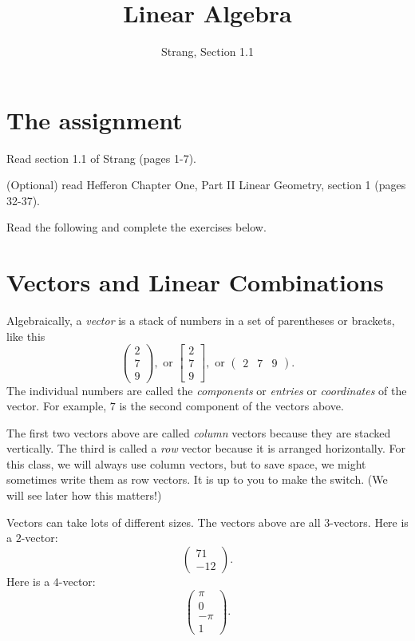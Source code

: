 \documentclass[11pt]{amsart}
\theoremstyle{definition}
\begin{document}
\title{Linear Algebra}
\author{Strang, Section 1.1}
\maketitle

\section{The assignment}
\begin{compactitem}
\item Read section 1.1 of Strang (pages 1-7).
\item (Optional) read Hefferon Chapter One, Part II Linear Geometry, section 1 (pages 32-37).
\item Read the following and complete the exercises below.
\end{compactitem}


\section{Vectors and Linear Combinations}

Algebraically, a \emph{vector} is a stack of numbers in a set of parentheses or brackets, like this
\[
\begin{pmatrix} 2 \\ 7 \\ 9 \end{pmatrix}, \text{ or } \begin{bmatrix}2 \\ 7 \\ 9 \end{bmatrix},
\text{ or } \begin{pmatrix} 2 & 7 & 9 \end{pmatrix} .
\]
The individual numbers are called the \emph{components} or \emph{entries} or \emph{coordinates} of the vector.
For example, $7$ is the second component of the vectors above.

The first two vectors above are called \emph{column} vectors because they are stacked vertically.
The third is called a \emph{row} vector because it is arranged horizontally.
For this class, we will always use column vectors, but to save space, we might sometimes write them as row vectors.
It is up to you to make the switch.
(We will see later how this matters!)

Vectors can take lots of different sizes. The vectors above are all $3$-vectors.
Here is a $2$-vector:
\[\left(\begin{smallmatrix} 71 \\ -12 \end{smallmatrix}\right).\]
Here is a $4$-vector:
\[\left(\begin{smallmatrix} \pi \\ 0 \\ -\pi \\ 1\end{smallmatrix}\right).\]
\end{document}
